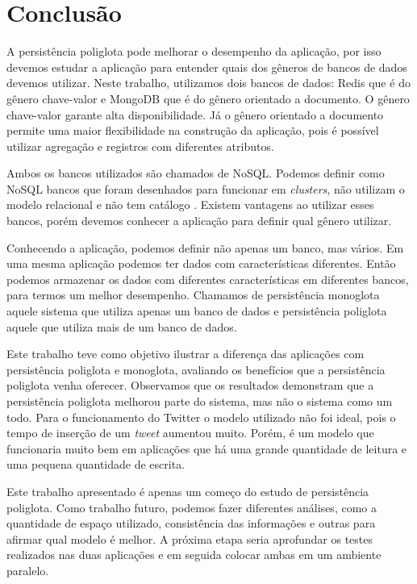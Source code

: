 \chapter{Conclusão}
\label{chap:conclusao}

A persistência poliglota pode melhorar o desempenho da aplicação, por isso devemos estudar a aplicação para entender quais dos gêneros de bancos de dados devemos utilizar. Neste trabalho, utilizamos dois bancos de dados: \ac{Redis} que é do gênero chave-valor e MongoDB que é do gênero orientado a documento. O gênero chave-valor garante alta disponibilidade. Já o gênero orientado a documento permite uma maior flexibilidade na construção da aplicação, pois é possível utilizar agregação e registros com diferentes atributos.

Ambos os bancos utilizados são chamados de NoSQL. Podemos definir como NoSQL bancos que foram desenhados para funcionar em \textit{clusters}, não utilizam o modelo relacional e não tem catálogo \cite{NoSQL}. Existem vantagens ao utilizar esses bancos, porém devemos conhecer a aplicação para definir qual gênero utilizar.

Conhecendo a aplicação, podemos definir não apenas um banco, mas vários. Em uma mesma aplicação podemos ter dados com características diferentes. Então podemos armazenar os dados com diferentes características em diferentes bancos, para termos um melhor desempenho. Chamamos de persistência monoglota aquele sistema que utiliza apenas um banco de dados e persistência poliglota aquele que utiliza mais de um banco de dados.

Este trabalho teve como objetivo ilustrar a diferença das aplicações com persistência poliglota e monoglota, avaliando os benefícios que a persistência poliglota venha oferecer. Observamos que os resultados demonstram que a persistência poliglota melhorou parte do sistema, mas não o sistema como um todo. Para o funcionamento do Twitter o modelo utilizado não foi ideal, pois o tempo de inserção de um \textit{tweet} aumentou muito. Porém, é um modelo que funcionaria muito bem em aplicações que há uma grande quantidade de leitura e uma pequena quantidade de escrita.

Este trabalho apresentado é apenas um começo do estudo de persistência poliglota. Como trabalho futuro, podemos fazer diferentes análises, como a quantidade de espaço utilizado, consistência das informações e outras para afirmar qual modelo é melhor. A próxima etapa seria aprofundar os testes realizados nas duas aplicações e em seguida colocar ambas em um ambiente paralelo.


